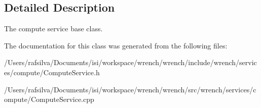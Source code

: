 \subsection{Detailed Description}
The compute service base class. 

The documentation for this class was generated from the following files\+:\begin{DoxyCompactItemize}
\item 
/\+Users/rafsilva/\+Documents/isi/workspace/wrench/wrench/include/wrench/services/compute/Compute\+Service.\+h\item 
/\+Users/rafsilva/\+Documents/isi/workspace/wrench/wrench/src/wrench/services/compute/Compute\+Service.\+cpp\end{DoxyCompactItemize}
